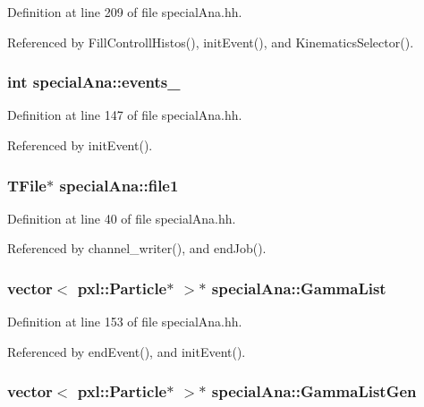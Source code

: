 Definition at line 209 of file special\-Ana.\-hh.



Referenced by Fill\-Controll\-Histos(), init\-Event(), and Kinematics\-Selector().

\subsubsection[{events\-\_\-}]{\setlength{\rightskip}{0pt plus 5cm}int special\-Ana\-::events\-\_\-}\label{classspecialAna_aff5d8d0f950637c1d885ebfff0c3b9a8}


Definition at line 147 of file special\-Ana.\-hh.



Referenced by init\-Event().

\subsubsection[{file1}]{\setlength{\rightskip}{0pt plus 5cm}T\-File$\ast$ special\-Ana\-::file1}\label{classspecialAna_a926d4b22d2a4c69f67ad9a2708ae96a0}


Definition at line 40 of file special\-Ana.\-hh.



Referenced by channel\-\_\-writer(), and end\-Job().

\subsubsection[{Gamma\-List}]{\setlength{\rightskip}{0pt plus 5cm}vector$<$ pxl\-::\-Particle$\ast$ $>$$\ast$ special\-Ana\-::\-Gamma\-List}\label{classspecialAna_ae66ed155895258a7dbbf3cc1d89a8e26}


Definition at line 153 of file special\-Ana.\-hh.



Referenced by end\-Event(), and init\-Event().

\subsubsection[{Gamma\-List\-Gen}]{\setlength{\rightskip}{0pt plus 5cm}vector$<$ pxl\-::\-Particle$\ast$ $>$$\ast$ special\-Ana\-::\-Gamma\-List\-Gen}\label{classspecialAna_a1e4de01edc121633e4c961284def2ef3}


